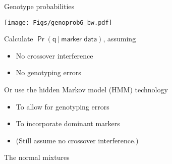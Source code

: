 \documentclass[12pt]{article}
\newcommand{\headsize}{\fontsize{35}{35} \selectfont}
\newcommand{\smallersize}{\fontsize{20}{25} \selectfont}
\begin{document}
\newpage


\headsize \color{myyellow}
\hfill \begin{minipage}{5.75in}
\centering
Genotype probabilities
\end{minipage}

\vspace{15mm}

\centerline{\texttt{[image: Figs/genoprob6\_bw.pdf]}}

\vspace{15mm}

\hfill
\begin{minipage}{10in}
\color{mywhite} \smallersize
Calculate {\color{myblue} $\mathsf{\Pr(q \ | \ \text{marker data})}$}, assuming
\begin{itemize}
\item No crossover interference
\item No genotyping errors
\end{itemize}

\vspace{10mm}

Or use the {\color{mypink} hidden Markov model (HMM)} technology
\begin{itemize}
\item To allow for genotyping errors
\item To incorporate dominant markers
\item {\color{myblue} (Still assume no crossover interference.)}
\end{itemize}
\end{minipage}




\newpage

\headsize \color{myyellow}
\hfill \begin{minipage}{5.75in}
\centering
The normal mixtures
\end{minipage}

\vspace{15mm}
\end{document}
